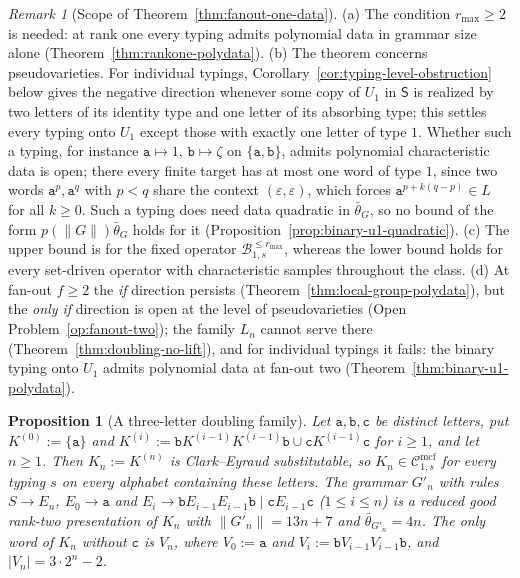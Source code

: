 \documentclass[11pt]{article}
\numberwithin{equation}{section}
\theoremstyle{plain}
\newtheorem{proposition}[theorem]{Proposition}
\theoremstyle{definition}
\theoremstyle{remark}
\newtheorem{remark}[theorem]{Remark}
\newcommand{\Cmcf}[2]{\mathcal{C}^{\mathrm{mcf}}_{#1,#2}}
\newcommand{\eps}{\varepsilon}
\begin{document}
\begin{remark}[Scope of Theorem~\ref{thm:fanout-one-data}]
\label{rem:fanout-one-data}
(a) The condition $r_{\max}\ge2$ is needed: at rank one every typing
admits polynomial data in grammar size alone
(Theorem~\ref{thm:rankone-polydata}).
(b) The theorem concerns pseudovarieties.  For individual typings,
Corollary~\ref{cor:typing-level-obstruction} below gives the negative direction
whenever some copy of $U_1$ in $\mathsf S$ is realized by two letters of its
identity type and one letter of its absorbing type; this settles every typing
onto $U_1$ except those with exactly one letter of type $1$.  Whether such a
typing, for instance $\mathtt a\mapsto1$, $\mathtt b\mapsto\zeta$ on
$\{\mathtt a,\mathtt b\}$, admits polynomial characteristic data is open; there
every finite target has at most one word of type $1$, since two words
$\mathtt a^p,\mathtt a^q$ with $p<q$ share the context $(\eps,\eps)$, which forces
$\mathtt a^{p+k(q-p)}\in L$ for all $k\ge0$.  Such a typing does need data
quadratic in $\bar\theta_G$, so no bound of the form $p(\|G\|)\bar\theta_G$
holds for it (Proposition~\ref{prop:binary-u1-quadratic}).
(c) The upper bound is for the fixed operator
$\mathcal B^{\le r_{\max}}_{1,s}$, whereas the lower bound holds for every
set-driven operator with characteristic samples throughout the class.
(d) At fan-out $f\ge2$ the \emph{if} direction persists
(Theorem~\ref{thm:local-group-polydata}), but the \emph{only if}
direction is open at the level of pseudovarieties (Open
Problem~\ref{op:fanout-two}); the family $L_n$ cannot serve there
(Theorem~\ref{thm:doubling-no-lift}), and for individual typings it fails:
the binary typing onto $U_1$ admits polynomial data at fan-out two
(Theorem~\ref{thm:binary-u1-polydata}).
\end{remark}

\begin{proposition}[A three-letter doubling family]
\label{prop:three-letter-family}
Let $\mathtt a,\mathtt b,\mathtt c$ be distinct letters, put $K^{(0)}:=\{\mathtt a\}$
and $K^{(i)}:=\mathtt bK^{(i-1)}K^{(i-1)}\mathtt b\cup\mathtt cK^{(i-1)}\mathtt c$ for
$i\ge1$, and let $n\ge1$.  Then $K_n:=K^{(n)}$ is Clark--Eyraud substitutable, so
$K_n\in\Cmcf{1}{s}$ for every typing $s$ on every alphabet containing these
letters.  The grammar $G'_n$ with rules $S\to E_n$, $E_0\to\mathtt a$ and
$E_i\to\mathtt bE_{i-1}E_{i-1}\mathtt b\mid\mathtt cE_{i-1}\mathtt c$
($1\le i\le n$) is a reduced good rank-two presentation of $K_n$ with
$\|G'_n\|=13n+7$ and $\bar\theta_{G'_n}=4n$.  The only word of $K_n$ without
$\mathtt c$ is $V_n$, where $V_0:=\mathtt a$ and
$V_i:=\mathtt bV_{i-1}V_{i-1}\mathtt b$, and $|V_n|=3\cdot2^n-2$.
\end{proposition}
\end{document}

